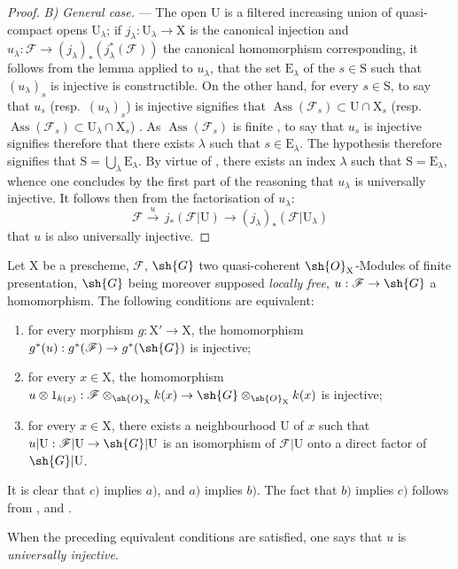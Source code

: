 \begin{proof}
\emph{B) General case.} --- The open $\mathrm{U}$ is a filtered increasing union of quasi-compact opens $\mathrm{U}_\lambda$; if $j_\lambda:\mathrm{U}_\lambda\to\mathrm{X}$ is the canonical injection and $u_\lambda:\mathscr{F}\to(j_\lambda)_*(j_\lambda^*(\mathscr{F}))$ the canonical homomorphism corresponding, it follows from the lemma  applied to $u_\lambda$, that the set $\mathrm{E}_\lambda$ of the $s\in\mathrm{S}$ such that $(u_\lambda)_s$ is injective is constructible.
On the other hand, for every $s\in\mathrm{S}$, to say that $u_s$ (resp.\ $(u_\lambda)_s$) is injective signifies that $\operatorname{Ass}(\mathscr{F}_s)\subset\mathrm{U}\cap\mathrm{X}_s$ (resp.\ $\operatorname{Ass}(\mathscr{F}_s)\subset\mathrm{U}_\lambda\cap\mathrm{X}_s$) .
As $\operatorname{Ass}(\mathscr{F}_s)$ is finite , to say that $u_s$ is injective signifies therefore that there exists $\lambda$ such that $s\in\mathrm{E}_\lambda$.
The hypothesis therefore signifies that $\mathrm{S}=\bigcup_\lambda\mathrm{E}_\lambda$.
By virtue of , there exists an index $\lambda$ such that $\mathrm{S}=\mathrm{E}_\lambda$, whence one concludes by the first part of the reasoning that $u_\lambda$ is universally injective.
It follows then from the factorisation of $u_\lambda$:
\[
  \mathscr{F}\xrightarrow{u}\,j_*(\mathscr{F}|\mathrm{U})\to(j_\lambda)_*(\mathscr{F}|\mathrm{U}_\lambda)
\]
that $u$ is also universally injective.
\end{proof}

\begin{remarks}[11.9.18]
\label{IV.11.9.18}
Let $\mathrm{X}$ be a prescheme, $\mathscr{F}$, $\sh{G}$ two quasi-coherent $\sh{O}_\mathrm{X}$-Modules of finite presentation, $\sh{G}$ being moreover supposed \emph{locally free}, $u:\mathscr{F}\to\sh{G}$ a homomorphism.
The following conditions are equivalent:
\begin{enumerate}[label=\emph{\alph*)}]
  \item for every morphism $g:\mathrm{X}'\to\mathrm{X}$, the homomorphism $g^*(u):g^*(\mathscr{F})\to g^*(\sh{G})$ is injective;
  \item for every $x\in\mathrm{X}$, the homomorphism $u\otimes 1_{k(x)}:\mathscr{F}\otimes_{\sh{O}_{\mathrm{X}}}k(x)\to\sh{G}\otimes_{\sh{O}_\mathrm{X}}k(x)$ is injective;
  \item for every $x\in\mathrm{X}$, there exists a neighbourhood $\mathrm{U}$ of $x$ such that $u|\mathrm{U}:\mathscr{F}|\mathrm{U}\to\sh{G}|\mathrm{U}$ is an isomorphism of $\mathscr{F}|\mathrm{U}$ onto a direct factor of $\sh{G}|\mathrm{U}$.
\end{enumerate}

It is clear that $c)$ implies $a)$, and $a)$ implies $b)$.
The fact that $b)$ implies $c)$ follows from ,  and .

When the preceding equivalent conditions are satisfied, one says that $u$ is \emph{universally injective}.
\end{remarks}


